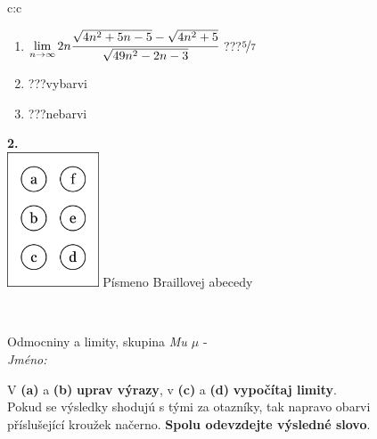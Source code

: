 \documentclass[10pt]{report}
\begin{document}
\begin{tabular}{c:c}
\begin{minipage}[c][104.5mm][t]{0.5\linewidth}
\begin{center}
\begin{minipage}{0.79\linewidth}
\begin{center}
\begin{varwidth}{\linewidth}
\begin{enumerate}
\item $\lim\limits_{n\to\infty}2n\cfrac{\sqrt{4n^2+5n-5}-\sqrt{4n^2+5}}{\sqrt{49n^2-2n-3}}$\quad \dotfill\; ???\;\dotfill \quad $\nicefrac{5}{7}$
\item \quad \dotfill\; ???\;\dotfill \quad vybarvi
\item \quad \dotfill\; ???\;\dotfill \quad nebarvi
\end{enumerate}
\end{varwidth}
\end{center}
\end{minipage}
\begin{minipage}{0.20\linewidth}
\begin{center}
{\Huge\bfseries 2.} \\[2mm]
\includegraphics[height=40mm]{../images/braille.png}
{\small Písmeno Braillovej abecedy}
\end{center}
\end{minipage}
\end{center}
\end{minipage}
\\ \hdashline
\begin{minipage}[c][104.5mm][t]{0.5\linewidth}
\begin{center}
\vspace{7mm}
{\huge Odmocniny a limity, skupina \textit{Mu $\mu$} -}\\[5mm]
\textit{Jméno:}\phantom{xxxxxxxxxxxxxxxxxxxxxxxxxxxxxxxxxxxxxxxxxxxxxxxxxxxxxxxxxxxxxxxxx}\\[5mm]
\begin{minipage}{0.95\linewidth}
\begin{center}
V \textbf{(a)} a \textbf{(b)} \textbf{uprav výrazy}, v \textbf{(c)} a \textbf{(d)} \textbf{vypočítaj limity}.\\Pokud se výsledky shodujú s tými za otazníky, tak napravo obarvi\\příslušející kroužek načerno. \textbf{Spolu odevzdejte výsledné slovo}.
\end{center}
\end{minipage}
\\[1mm]

\end{center}
\end{minipage}
\end{tabular}
\end{document}
